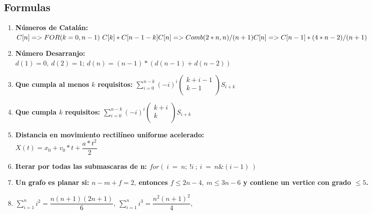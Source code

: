 \documentclass[7pt,twocolumn, landscape, letterpaper,bfseries]{article}
\begin{document}
\subsection*{Formulas}
	\begin{enumerate}
		\item \textbf{
			N\'umeros de Catal\'an: \\
			$C[n] => FOR(k=0,n-1)\  C[k] * C[n-1-k]\\
			C[n] => Comb(2*n,n) / (n + 1)\\
			C[n] => C[n-1]*(4*n-2)/(n+1)$				 
		}
		\item \textbf{
			N\'umero Desarranjo: \\
			$d(1) = 0,\  d(2) = 1;\  
			d(n) = (n-1)*(d(n-1) + d(n-2))$				 
		}
		\item \textbf{
			Que cumpla al menos $k$ requisitos:   
			$\sum_{i=0}^{n-k}(-i)^i\left( \begin{array}{c} k+i-1 \\ k-1 \\ \end{array} \right) S_{i+k}$
		}
		\item \textbf{
			Que cumpla $k$ requisitos:
			$\sum_{i=0}^{n-k}(-i)^i\left( \begin{array}{c} k+i \\ k \\ \end{array} \right) S_{i+k}$	 
		}
		\item \textbf{
			Distancia en movimiento rectil\'ineo uniforme acelerado:\\
			$X(t) = x_0 + v_0*t + \dfrac{a*t^2}{2}$	 
		}
		\item \textbf{
			Iterar por todas las submascaras de n: $for(\ i\  = \  n;\ 
			!i\ ;\ i\ = \ n \&\left(i-1\right) \  )$				 
		}
		\item \textbf{
			Un grafo es planar si:
			$n - m + f = 2,\ $entonces $f \leq 2n-4,\ m \leq 3n-6$ y contiene un vertice con grado $\leq 5$.
		}
		\item \textbf{
			$\sum_{i=1}^{n}i^2=\dfrac{n(n+1)(2n+1)}{6},\ 
			\sum_{i=1}^{n}i^3=\dfrac{n^2(n+1)^2}{4},$
		}
	\end{enumerate}
\end{document}
